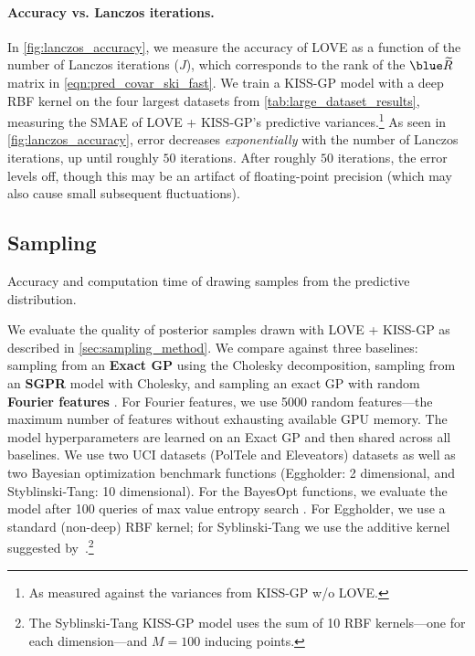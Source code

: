 \paragraph{Accuracy vs. Lanczos iterations.}
In \cref{fig:lanczos_accuracy}, we measure the accuracy of LOVE{} as a function of the number of Lanczos iterations ($J$), which corresponds to the rank of the $\blue \widetilde \bR$ matrix in \cref{eqn:pred_covar_ski_fast}.
We train a KISS-GP model with a deep RBF kernel on the four largest datasets from \cref{tab:large_dataset_results}, measuring the SMAE of LOVE + KISS-GP's predictive variances.\footnote{
  As measured against the variances from KISS-GP w/o LOVE.
}
As seen in \cref{fig:lanczos_accuracy}, error decreases \emph{exponentially} with the number of Lanczos iterations, up until roughly $50$ iterations.
After roughly $50$ iterations, the error levels off, though this may be an artifact of floating-point precision (which may also cause small subsequent fluctuations).



\subsection{Sampling}

\begin{table}[t!]
  \caption[Accuracy and computation time of drawing samples from the posterior distribution.]{
    Accuracy and computation time of drawing samples from the predictive distribution.
    \label{tab:sampling_results}
  }
  \vspace{0.5ex}
  \centering
  \resizebox{\textwidth}{!}{%
    
  }
  \vspace{1em}

  \resizebox{\textwidth}{!}{%
    
  }
\end{table}

We evaluate the quality of posterior samples drawn with LOVE + KISS-GP{} as described in \cref{sec:sampling_method}.
We compare against three baselines: sampling from an {\bf Exact GP} using the Cholesky decomposition, sampling from an {\bf SGPR} model with Cholesky, and sampling an exact GP with random {\bf Fourier features} \citep{rahimi2008random}.
For Fourier features, we use 5000 random features---the maximum number of features without exhausting available GPU memory.
The model hyperparameters are learned on an Exact GP and then shared across all baselines.
We use two UCI datasets (PolTele and Eleveators) datasets as well as two Bayesian optimization benchmark functions (Eggholder: 2 dimensional, and Styblinski-Tang: 10 dimensional).
For the BayesOpt functions, we evaluate the model after 100 queries of max value entropy search \cite{wang2017max}.
For Eggholder, we use a standard (non-deep) RBF kernel;  for Syblinski-Tang we use the additive kernel suggested by~\citet{kandasamy2015high}.\footnote{
  The Syblinski-Tang KISS-GP model uses the sum of 10 RBF kernels---one for each dimension---and $M=100$ inducing points.
}

